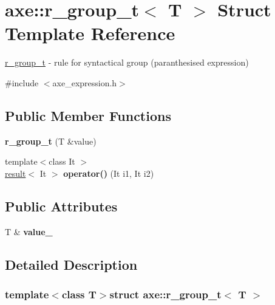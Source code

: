 \hypertarget{structaxe_1_1r__group__t}{\section{axe\+:\+:r\+\_\+group\+\_\+t$<$ T $>$ Struct Template Reference}
\label{structaxe_1_1r__group__t}
}


\hyperlink{structaxe_1_1r__group__t}{r\+\_\+group\+\_\+t} -\/ rule for syntactical group (paranthesised expression)  




{\ttfamily \#include $<$axe\+\_\+expression.\+h$>$}

\subsection*{Public Member Functions}
\begin{DoxyCompactItemize}
\item 
\hypertarget{structaxe_1_1r__group__t_a10cdc19d9f0f5751008065706d40a617}{{\bfseries r\+\_\+group\+\_\+t} (T \&value)}\label{structaxe_1_1r__group__t_a10cdc19d9f0f5751008065706d40a617}

\item 
\hypertarget{structaxe_1_1r__group__t_ac5d3e066c6ceb7a4232bf3989750e960}{{\footnotesize template$<$class It $>$ }\\\hyperlink{structaxe_1_1result}{result}$<$ It $>$ {\bfseries operator()} (It i1, It i2)}\label{structaxe_1_1r__group__t_ac5d3e066c6ceb7a4232bf3989750e960}

\end{DoxyCompactItemize}
\subsection*{Public Attributes}
\begin{DoxyCompactItemize}
\item 
\hypertarget{structaxe_1_1r__group__t_af551252399adea304986d99983dc8c30}{T \& {\bfseries value\+\_\+}}\label{structaxe_1_1r__group__t_af551252399adea304986d99983dc8c30}

\end{DoxyCompactItemize}


\subsection{Detailed Description}
\subsubsection*{template$<$class T$>$struct axe\+::r\+\_\+group\+\_\+t$<$ T $>$}

